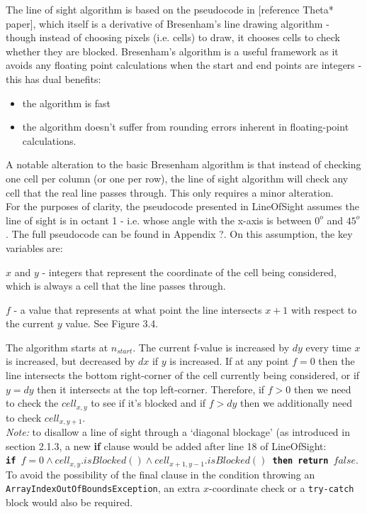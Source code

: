 \documentclass[12pt,notitlepage]{report}
\begin{document}
\noindent
The line of sight algorithm is based on the pseudocode in [reference Theta* paper], which itself is a derivative of Bresenham's line drawing algorithm - though instead of choosing pixels (i.e. cells) to draw, it chooses cells to check whether they are blocked. Bresenham's algorithm is a useful framework as it avoids any floating point calculations when the start and end points are integers - this has dual benefits:
\begin{itemize}
\item the algorithm is fast
\item the algorithm doesn't suffer from rounding errors inherent in floating-point calculations. 
\end{itemize}
\noindent
A notable alteration to the basic Bresenham algorithm is that instead of checking one cell per column (or one per row), the line of sight algorithm will check any cell that the real line passes through. This only requires a minor alteration.\\

\noindent
For the purposes of clarity, the pseudocode presented in {\sc LineOfSight} assumes the line of sight is in octant 1 - i.e. whose angle with the x-axis is between $0^{o}$ and $45^{o}$. The full pseudocode can be found in Appendix ?. On this assumption, the key variables are:
\begin{description}
\item{$x$ and $y$} - integers that represent the coordinate of the cell being considered, which is always a cell that the line passes through.
\item{$f$} - a value that represents at what point the line intersects $x+1$ with respect to the current $y$ value. See Figure 3.4.
\end{description}

\noindent
The algorithm starts at $n_{start}$. The current f-value is increased by $dy$ every time $x$ is increased, but decreased by $dx$ if $y$ is increased. If at any point $f = 0$ then the line intersects the bottom right-corner of the cell currently being considered, or if $y = dy$ then it intersects at the top left-corner. Therefore, if $f > 0$ then we need to check the $cell_{x,y}$ to see if it's blocked and if $f > dy$ then we additionally need to check $cell_{x,y+1}$.\\

\noindent
{\em Note:} to disallow a line of sight through a `diagonal blockage' (as introduced in section 2.1.3, a new {\bf if} clause would be added after line 18 of {\sc LineOfSight}:\\
\noindent 
{\tt {\bf if} $f = 0 \land cell_{x,y}.isBlocked() \land cell_{x+1,y-1}.isBlocked()$ {\bf then return} $false$}.\\
\noindent 
To avoid the possibility of the final clause in the condition throwing an {\tt ArrayIndexOutOfBoundsException}, an extra $x$-coordinate check or a {\tt try-catch} block would also be required.
\end{document}
